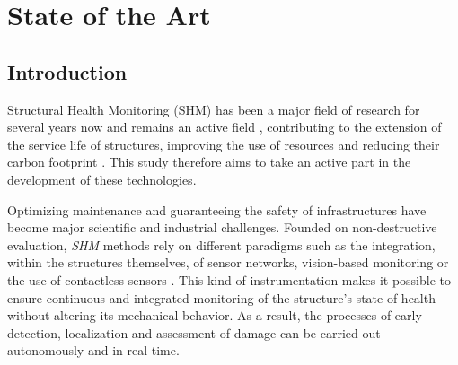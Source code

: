 \documentclass[12pt]{article}
\begin{document}
\setcounter{tocdepth}{1}                                    %
\setlength{\cftbeforesecskip}{10pt}                         %
\setlength{\cftsecnumwidth}{3em}
 
\renewcommand{\contentsname}{Contents}
\renewcommand{\cftsecleader}{\cftdotfill{\cftdotsep}}
\renewcommand{\cftsubsecleader}{\cftdotfill{\cftdotsep}}
\renewcommand{\cfttoctitlefont}{\Huge\bfseries\centering}   %
\renewcommand{\cftsecfont}{\large\bfseries}                 %
\renewcommand{\cftsubsecfont}{\normalsize}                  %
\renewcommand{\cftsecpagefont}{}                            %
\renewcommand{\cftdotsep}{0.5}                              %
 
\tableofcontents
 
\newpage
\section{State of the Art}
 
\subsection{Introduction}
 
Structural Health Monitoring (SHM) has been a major field of research for several years now and remains an active field \cite{s25196136, SPENCER2025100203, Khatir2025}, contributing to the extension of the service life of structures, improving the use of resources and reducing their carbon footprint \cite{DHIRAJ2021199}. This study therefore aims to take an active part in the development of these technologies. 
 
Optimizing maintenance and guaranteeing the safety of infrastructures have become major scientific and industrial challenges. Founded on non-destructive evaluation, \textit{SHM} methods rely on different paradigms such as the integration, within the structures themselves, of sensor networks, vision-based monitoring or the use of contactless sensors \cite{SPENCER2025100203, Khatir2025}. This kind of instrumentation makes it possible to ensure continuous and integrated monitoring of the structure's state of health without altering its mechanical behavior. As a result, the processes of early detection, localization and assessment of damage can be carried out autonomously and in real time.
 
\end{document}
